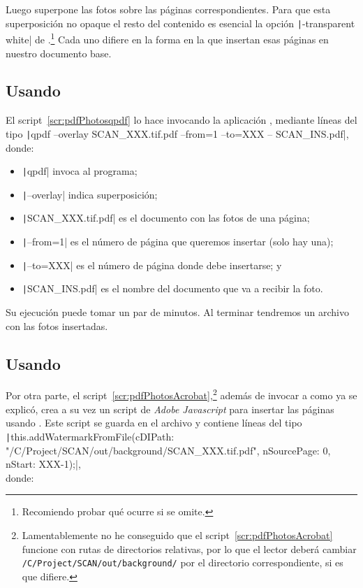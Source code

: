 \documentclass[%
	a5paper,
	10pt,
	twoside,
	openright,
	final,
]{memoir}
\begin{document}
{	Luego superpone las fotos sobre las páginas correspondientes. Para que esta superposición no opaque el resto del contenido es esencial la opción \texttt|-transparent white| de \imagemagick.\footnote{Recomiendo probar qué ocurre si se omite.} Cada uno difiere en la forma en la que insertan esas páginas en nuestro documento base.

	\subsection{Usando \texorpdfstring{\qpdf}{QPDF}\label{sec:pdfPhotosqpdf}} El script~\ref{scr:pdfPhotosqpdf} lo hace invocando la aplicación \qpdf, mediante líneas del tipo \texttt|qpdf --overlay SCAN_XXX.tif.pdf --from=1 --to=XXX -- SCAN_INS.pdf|, donde:

	\begin{itemize}[noitemsep]
		\item \texttt|qpdf| invoca al programa;
		\item \texttt|--overlay| indica superposición;
		\item \texttt|SCAN_XXX.tif.pdf| es el documento con las fotos de una página;
		\item \texttt|--from=1| es el número de página que queremos insertar (solo hay una);
		\item \texttt|--to=XXX| es el número de página donde debe insertarse; y
		\item \texttt|SCAN_INS.pdf| es el nombre del documento que va a recibir la foto.
	\end{itemize}



	Su ejecución puede tomar un par de minutos. Al terminar tendremos un archivo  con las fotos insertadas.

	\subsection{Usando \acrobat\label{sec:pdfPhotosAcrobat}} Por otra parte, el script~\ref{scr:pdfPhotosAcrobat},\footnote{Lamentablemente no he conseguido que el script~\ref{scr:pdfPhotosAcrobat} funcione con rutas de directorios relativas, por lo que el lector deberá cambiar \texttt{/C/Project/SCAN/out/background/} por el directorio correspondiente, si es que difiere.} además de invocar a \imagemagick como ya se explicó, crea a su vez un script de \emph{Adobe Javascript} para insertar las páginas usando \acrobat \cite{AdobeJavaScriptGuide, AdobeJavaScriptReference}. Este script se guarda en el archivo  y contiene líneas del tipo \texttt|this.addWatermarkFromFile({cDIPath: "/C/Project/SCAN/out/background/SCAN_XXX.tif.pdf", nSourcePage: 0, nStart: XXX-1});|,\\donde:

}
\end{document}
